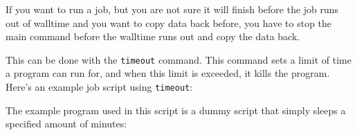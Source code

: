 If you want to run a job, but you are not sure it will finish before the job runs
out of walltime and you want to copy data back before, you have to stop the main
command before the walltime runs out and copy the data back.

This can be done with the \lstinline|timeout| command. This command sets a limit
of time a program can run for, and when this limit is exceeded, it kills the program.
Here's an example job script using \lstinline|timeout|:


The example program used in this script is a dummy script that simply sleeps a specified amount of minutes:

